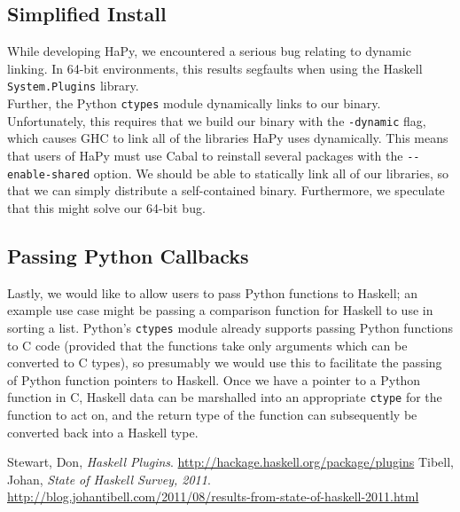 \documentclass[11pt, letterpaper, oneside, twocolumn] {article}
\begin{document}
\subsection{Simplified Install}
\label{sec:simple_install}
While developing HaPy, we encountered a serious bug relating to dynamic linking. In 64-bit environments, this results segfaults when using the Haskell \verb!System.Plugins! library. \\
Further, the Python \verb!ctypes! module dynamically links to our binary. Unfortunately, this requires that we build our binary with the \verb!-dynamic! flag, which causes GHC to link all of the libraries HaPy uses dynamically. This means that users of HaPy must use Cabal to reinstall several packages with the \verb!--enable-shared! option. We should be able to statically link all of our libraries, so that we can simply distribute a self-contained binary. Furthermore, we speculate that this might solve our 64-bit bug.


\subsection{Passing Python Callbacks}
Lastly, we would like to allow users to pass Python functions to Haskell; an example use case might be passing a comparison function for Haskell to use in sorting a list. Python's \verb!ctypes! module already supports passing Python functions to C code (provided that the functions take only arguments which can be converted to C types), so presumably we would use this to facilitate the passing of Python function pointers to Haskell. Once we have a pointer to a Python function in C, Haskell data can be marshalled into an appropriate \verb!ctype! for the function to act on, and the return type of the function can subsequently be converted back into a Haskell type.

\begin{thebibliography}{99}
  Stewart, Don,
  \emph{Haskell Plugins}.
  \url{http://hackage.haskell.org/package/plugins}
  Tibell, Johan,
  \emph{State of Haskell Survey, 2011}.
  \url{http://blog.johantibell.com/2011/08/results-from-state-of-haskell-2011.html}
\end{thebibliography}
\end{document}
